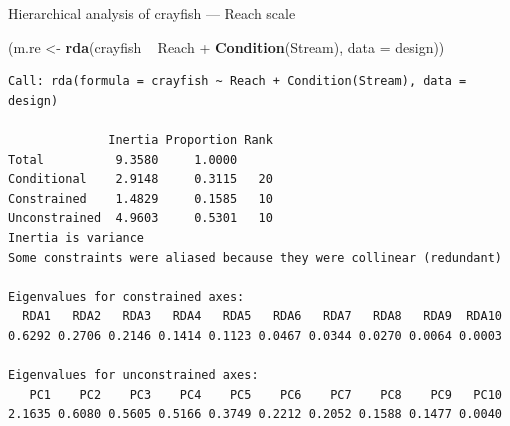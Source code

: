 \documentclass[10pt,ignorenonframetext,compress, aspectratio=169]{beamer}
\newenvironment{Shaded}{\begin{snugshade}}{\end{snugshade}}
\newcommand{\KeywordTok}[1]{\textcolor[rgb]{0.13,0.29,0.53}{\textbf{{#1}}}}
\newcommand{\DataTypeTok}[1]{\textcolor[rgb]{0.13,0.29,0.53}{{#1}}}
\newcommand{\StringTok}[1]{\textcolor[rgb]{0.31,0.60,0.02}{{#1}}}
\newcommand{\NormalTok}[1]{{#1}}
\begin{document}
\begin{frame}[fragile]{Hierarchical analysis of crayfish --- Reach
scale}

\scriptsize

\begin{Shaded}
\begin{Highlighting}[]
\NormalTok{(m.re <-}\StringTok{ }\KeywordTok{rda}\NormalTok{(crayfish ~}\StringTok{ }\NormalTok{Reach +}\StringTok{ }\KeywordTok{Condition}\NormalTok{(Stream), }\DataTypeTok{data =} \NormalTok{design))}
\end{Highlighting}
\end{Shaded}

\begin{verbatim}
Call: rda(formula = crayfish ~ Reach + Condition(Stream), data =
design)

              Inertia Proportion Rank
Total          9.3580     1.0000     
Conditional    2.9148     0.3115   20
Constrained    1.4829     0.1585   10
Unconstrained  4.9603     0.5301   10
Inertia is variance 
Some constraints were aliased because they were collinear (redundant)

Eigenvalues for constrained axes:
  RDA1   RDA2   RDA3   RDA4   RDA5   RDA6   RDA7   RDA8   RDA9  RDA10 
0.6292 0.2706 0.2146 0.1414 0.1123 0.0467 0.0344 0.0270 0.0064 0.0003 

Eigenvalues for unconstrained axes:
   PC1    PC2    PC3    PC4    PC5    PC6    PC7    PC8    PC9   PC10 
2.1635 0.6080 0.5605 0.5166 0.3749 0.2212 0.2052 0.1588 0.1477 0.0040 
\end{verbatim}

\normalsize

\end{frame}
\end{document}
